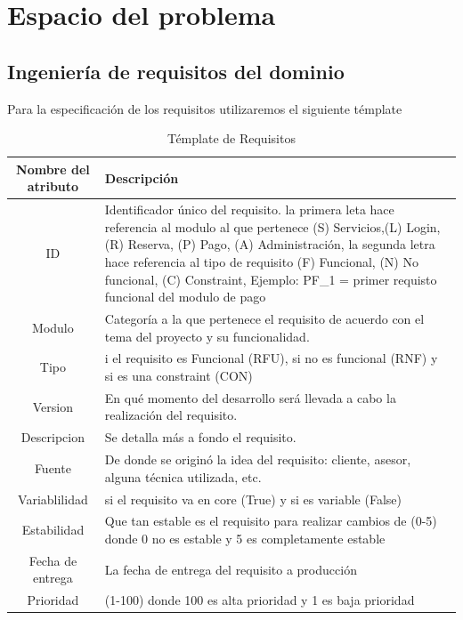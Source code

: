 \documentclass[10pt,a4paper,openany]{book}
\begin{document}
\chapter{Espacio del problema}

\section{Ingeniería de requisitos del dominio}
Para la especificación de los requisitos utilizaremos el siguiente témplate

\begin{table}[htbp]
\centering
\begin{tabular}{|c|p{10cm}|} \hline
Nombre del atributo & Descripción \\[0.5ex] \hline
ID & Identificador único del requisito. la primera leta hace referencia al modulo al que pertenece (S) Servicios,(L) Login, (R) Reserva, (P) Pago, (A) Administración, la segunda letra hace referencia al tipo de requisito (F) Funcional, (N) No funcional, (C) Constraint, Ejemplo: PF\_1 = primer requisto funcional del modulo de pago \\[0.5ex] \hline
Modulo & Categoría a la que pertenece el requisito de acuerdo con el tema del proyecto y su funcionalidad.\\[0.5ex] \hline
Tipo & i el requisito es Funcional (RFU), si no es funcional (RNF) y si es una constraint (CON) \\[0.5ex] \hline
Version & En qué momento del desarrollo será llevada a cabo la realización del requisito.\\[0.5ex] \hline
Descripcion & Se detalla más a fondo el requisito.\\[0.5ex] \hline
Fuente & De donde se originó la idea del requisito: cliente, asesor, alguna técnica utilizada, etc.\\[0.5ex] \hline
Variablilidad & si el requisito va en core (True) y si es variable (False) \\[0.5ex] \hline
Estabilidad &  Que tan estable es el requisito para realizar cambios de (0-5) donde 0 no es estable y 5 es completamente estable\\[0.5ex] \hline
Fecha de entrega & La fecha de entrega del requisito a producción\\[0.5ex] \hline
Prioridad & (1-100) donde 100 es alta prioridad y 1 es baja prioridad\\[0.5ex] \hline
\end{tabular}
\caption{Témplate de Requisitos}
\label{table:t6}
\end{table}
\end{document}

